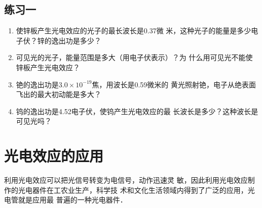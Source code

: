 \subsection*{练习一}

\begin{enumerate}
    \item 使锌板产生光电效应的光子的最长波长是0.37微
米，这种光子的能量是多少电子伏？锌的逸出功是多少？
\item 可见光的光子，能量范围是多大（用电子伏表示）？为
什么用可见光不能使锌板产生光电效应？
\item 铯的逸出功是$3.0\times10^{-19}$焦，用波长是0.59微米的
黄光照射铯，电子从绝表面飞出的最大初动能是多大？
\item 钨的逸出功是4.52电子伏，使钨产生光电效应的最
长波长是多少？这种波长是可见光吗？
\end{enumerate}

\section{光电效应的应用}

利用光电效应可以把光信号转变为电信号，动作迅速灵
敏，因此利用光电效应制作的光电器件在工农业生产，科学技
术和文化生活领域内得到了广泛的应用，光电管就是应用最
普遍的一种光电器件．

